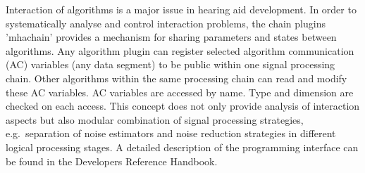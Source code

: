 Interaction of algorithms is a major issue in hearing aid
development. In order to systematically analyse and control
interaction problems, the \mha{} chain plugins 'mhachain' provides 
a mechanism for sharing parameters and states between algorithms. 
Any algorithm plugin can register selected
algorithm communication (AC) variables (any data segment) to be public
within one signal processing chain. Other algorithms within the same 
processing chain can read and modify these AC variables. AC variables 
are accessed by name. Type and dimension are checked on each access. 
This concept does not only provide analysis of interaction aspects 
but also modular combination of signal processing strategies, 
e.g.\ separation of noise estimators and noise reduction strategies 
in different logical processing stages. A detailed description of 
the programming interface can be found in the Developers Reference Handbook.


